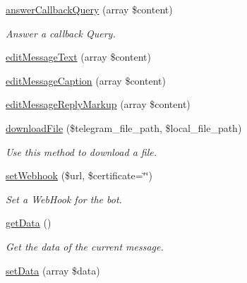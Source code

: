 \begin{DoxyCompactItemize}
\hyperlink{class_telegram_a55fa1d6bbcca385e333b402894e8ca37}{answer\-Callback\-Query} (array \$content)
\begin{DoxyCompactList}\small\item\em \-Answer a callback \-Query. \end{DoxyCompactList}\item 
\hyperlink{class_telegram_afbc4f6fd5f28a20e1bea0b083863b688}{edit\-Message\-Text} (array \$content)
\item 
\hyperlink{class_telegram_a3531b07c9dc7afb693c6e956e5debdad}{edit\-Message\-Caption} (array \$content)
\item 
\hyperlink{class_telegram_acd615562e6a6eeeb3d8a825eb03e3e5f}{edit\-Message\-Reply\-Markup} (array \$content)
\item 
\hyperlink{class_telegram_af08c6bc7982d71857f05c0756221a703}{download\-File} (\$telegram\-\_\-file\-\_\-path, \$local\-\_\-file\-\_\-path)
\begin{DoxyCompactList}\small\item\em \-Use this method to download a file. \end{DoxyCompactList}\item 
\hyperlink{class_telegram_ae94b55864cae3e7751e7293585eec9f5}{set\-Webhook} (\$url, \$certificate=\char`\"{}\char`\"{})
\begin{DoxyCompactList}\small\item\em \-Set a \-Web\-Hook for the bot. \end{DoxyCompactList}\item 
\hyperlink{class_telegram_a81a67162a6288d78fc4c55283325f0b4}{get\-Data} ()
\begin{DoxyCompactList}\small\item\em \-Get the data of the current message. \end{DoxyCompactList}\item 
\hypertarget{class_telegram_a87449bdd364c33ff024d32896342bf31}{\hyperlink{class_telegram_a87449bdd364c33ff024d32896342bf31}{set\-Data} (array \$data)}\label{class_telegram_a87449bdd364c33ff024d32896342bf31}


\end{DoxyCompactItemize}
